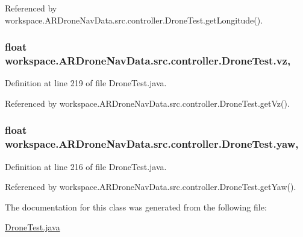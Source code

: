 Referenced by workspace.\+A\+R\+Drone\+Nav\+Data.\+src.\+controller.\+Drone\+Test.\+get\+Longitude().

\hypertarget{classworkspace_1_1_a_r_drone_nav_data_1_1src_1_1controller_1_1_drone_test_ae3be43e32715a5b7ecaf2f1ff8ae4603}{}
\subsubsection[{vz}]{\setlength{\rightskip}{0pt plus 5cm}float workspace.\+A\+R\+Drone\+Nav\+Data.\+src.\+controller.\+Drone\+Test.\+vz\hspace{0.3cm}{\ttfamily [static]}, {\ttfamily [protected]}}\label{classworkspace_1_1_a_r_drone_nav_data_1_1src_1_1controller_1_1_drone_test_ae3be43e32715a5b7ecaf2f1ff8ae4603}


Definition at line 219 of file Drone\+Test.\+java.



Referenced by workspace.\+A\+R\+Drone\+Nav\+Data.\+src.\+controller.\+Drone\+Test.\+get\+Vz().

\hypertarget{classworkspace_1_1_a_r_drone_nav_data_1_1src_1_1controller_1_1_drone_test_a3a79d04620fe8a242fa225f6174cb2d6}{}
\subsubsection[{yaw}]{\setlength{\rightskip}{0pt plus 5cm}float workspace.\+A\+R\+Drone\+Nav\+Data.\+src.\+controller.\+Drone\+Test.\+yaw\hspace{0.3cm}{\ttfamily [static]}, {\ttfamily [protected]}}\label{classworkspace_1_1_a_r_drone_nav_data_1_1src_1_1controller_1_1_drone_test_a3a79d04620fe8a242fa225f6174cb2d6}


Definition at line 216 of file Drone\+Test.\+java.



Referenced by workspace.\+A\+R\+Drone\+Nav\+Data.\+src.\+controller.\+Drone\+Test.\+get\+Yaw().



The documentation for this class was generated from the following file\+:\begin{DoxyCompactItemize}
\item 
\hyperlink{_drone_test_8java}{Drone\+Test.\+java}\end{DoxyCompactItemize}
